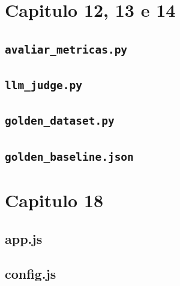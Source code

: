 \section{Capitulo 12, 13 e 14}

\subsection{\texttt{avaliar\_metricas.py}}


\subsection{\texttt{llm\_judge.py}}


\subsection{\texttt{golden\_dataset.py}}


\subsection{\texttt{golden\_baseline.json}}


\section{Capitulo 18}

\subsection{app.js}


\subsection{config.js}

